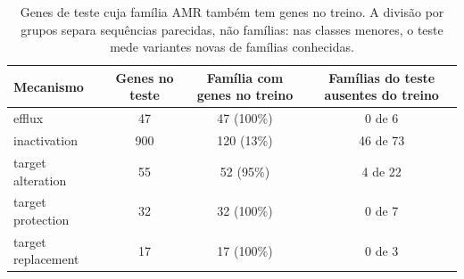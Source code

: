 \begin{table}[htbp]
  \centering
  \caption{Genes de teste cuja família AMR também tem genes no treino. A divisão por grupos separa sequências parecidas, não famílias: nas classes menores, o teste mede variantes novas de famílias conhecidas.}
  \label{tab:familias_teste}
  \begin{tabular}{lccc}
    \toprule
    Mecanismo & Genes no teste & Família com genes no treino & Famílias do teste ausentes do treino \\
    \midrule
    efflux & 47 & 47 (100\%) & 0 de 6 \\
    inactivation & 900 & 120 (13\%) & 46 de 73 \\
    target alteration & 55 & 52 (95\%) & 4 de 22 \\
    target protection & 32 & 32 (100\%) & 0 de 7 \\
    target replacement & 17 & 17 (100\%) & 0 de 3 \\
    \bottomrule
  \end{tabular}
\end{table}
